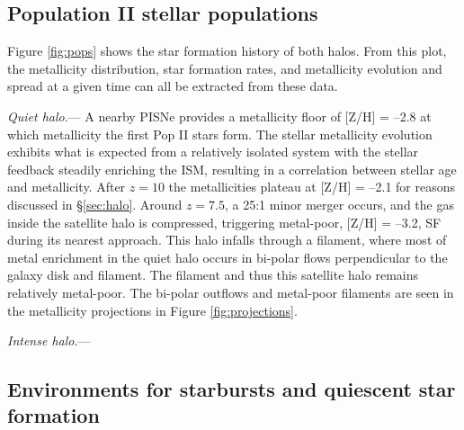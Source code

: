 \documentclass[apjl]{emulateapj}
\begin{document}
\subsection{Population II stellar populations}
\label{sec:pop}

\begin{figure*}
  \caption{\label{fig:pops} The scatter plots show the star formation
    history of the intense (left) and quiet (right) halos as a
    function of metallicity at $z=7$.  Each circle represents a star
    cluster, whose area is proportional to its mass.  The open circles
    in the upper right represent sizes of $10^3$, $10^4$, and $10^5$
    \Ms~star clusters.  The upper histogram collects the star formation
    history into 25 equal temporal bins.  The right histogram depicts
    the stellar metallicity distribution.}
\end{figure*}


Figure \ref{fig:pops} shows the star formation history of both halos.
From this plot, the metallicity distribution, star formation rates,
and metallicity evolution and spread at a given time can all be
extracted from these data.

\textit{Quiet halo}.--- 
A nearby PISNe provides a metallicity floor of [Z/H] = --2.8 at which
metallicity the first Pop II stars form.  The stellar metallicity
evolution exhibits what is expected from a relatively isolated system
with the stellar feedback steadily enriching the ISM, resulting in a
correlation between stellar age and metallicity.  After $z=10$ the
metallicities plateau at [Z/H] = --2.1 for reasons discussed in
\S\ref{sec:halo}.  Around $z=7.5$, a 25:1 minor merger occurs, and the
gas inside the satellite halo is compressed, triggering metal-poor,
[Z/H] = --3.2, SF during its nearest approach.  This halo infalls
through a filament, where most of metal enrichment in the quiet halo
occurs in bi-polar flows perpendicular to the galaxy disk and
filament.  The filament and thus this satellite halo remains
relatively metal-poor.  The bi-polar outflows and metal-poor filaments
are seen in the metallicity projections in Figure
\ref{fig:projections}.
       

\textit{Intense halo}.---

\subsection{Environments for starbursts and quiescent star formation}
\end{document}
